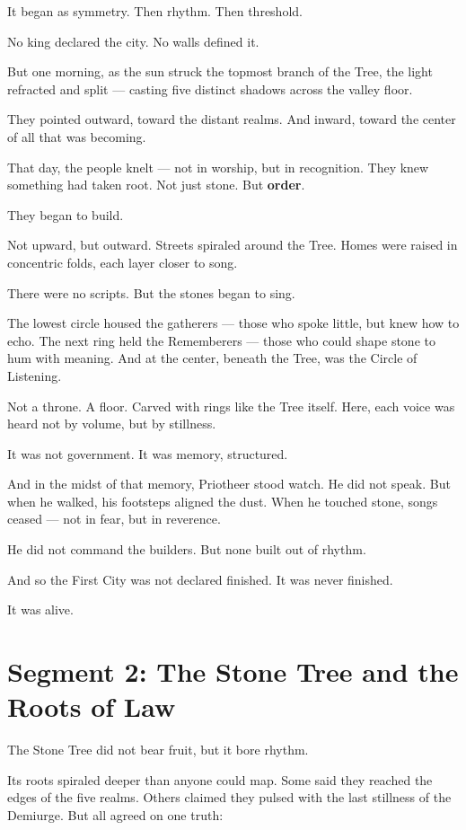 \documentclass[10pt]{article}
\begin{document}
It began as symmetry.  
Then rhythm.  
Then threshold.

No king declared the city.  
No walls defined it.

But one morning, as the sun struck the topmost branch of the Tree, the light refracted and split —  
casting five distinct shadows across the valley floor.

They pointed outward, toward the distant realms.  
And inward, toward the center of all that was becoming.

That day, the people knelt — not in worship, but in recognition.  
They knew something had taken root.  
Not just stone.  
But \textbf{order}.

They began to build.

Not upward, but outward.  
Streets spiraled around the Tree.  
Homes were raised in concentric folds, each layer closer to song.

There were no scripts.  
But the stones began to sing.

The lowest circle housed the gatherers — those who spoke little, but knew how to echo.  
The next ring held the Rememberers — those who could shape stone to hum with meaning.  
And at the center, beneath the Tree, was the Circle of Listening.

Not a throne.  
A floor.  
Carved with rings like the Tree itself.  
Here, each voice was heard not by volume, but by stillness.

It was not government.  
It was memory, structured.

And in the midst of that memory, Priotheer stood watch.  
He did not speak.  
But when he walked, his footsteps aligned the dust.  
When he touched stone, songs ceased — not in fear, but in reverence.

He did not command the builders.  
But none built out of rhythm.

And so the First City was not declared finished.  
It was never finished.

It was alive.

\newpage

\section*{Segment 2: The Stone Tree and the Roots of Law}

The Stone Tree did not bear fruit, but it bore rhythm.

Its roots spiraled deeper than anyone could map.  
Some said they reached the edges of the five realms.  
Others claimed they pulsed with the last stillness of the Demiurge.  
But all agreed on one truth:
\end{document}
